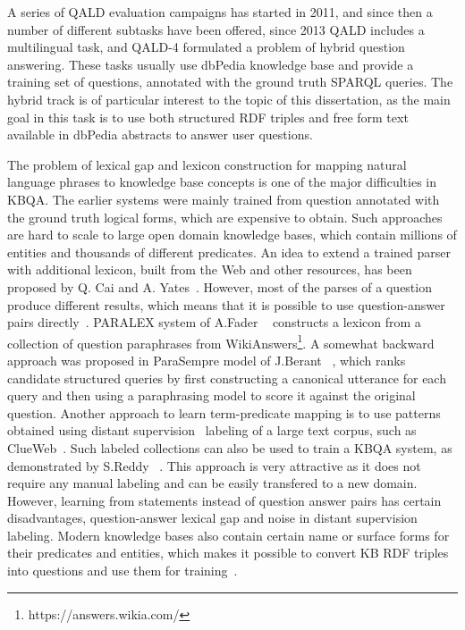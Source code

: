 A series of QALD evaluation campaigns has started in 2011, and since then a number of different subtasks have been offered, \ie since 2013 QALD includes a multilingual task, and QALD-4 formulated a problem of hybrid question answering.
These tasks usually use dbPedia knowledge base and provide a training set of questions, annotated with the ground truth SPARQL queries.
The hybrid track is of particular interest to the topic of this dissertation, as the main goal in this task is to use both structured RDF triples and free form text available in dbPedia abstracts to answer user questions.

The problem of lexical gap and lexicon construction for mapping natural language phrases to knowledge base concepts is one of the major difficulties in KBQA.
The earlier systems were mainly trained from question annotated with the ground truth logical forms, which are expensive to obtain.
Such approaches are hard to scale to large open domain knowledge bases, which contain millions of entities and thousands of different predicates.
An idea to extend a trained parser with additional lexicon, built from the Web and other resources, has been proposed by Q. Cai and A. Yates~\cite{CaiY13}.
However, most of the parses of a question produce different results, which means that it is possible to use question-answer pairs directly~\cite{BerantCFL13:sempre}.
PARALEX system of A.Fader \etal~\cite{fader2013paraphrase} constructs a lexicon from a collection of question paraphrases from WikiAnswers\footnote{https://answers.wikia.com/}.
A somewhat backward approach was proposed in ParaSempre model of J.Berant \etal~\cite{BerantL14:parasempre}, which ranks candidate structured queries by first constructing a canonical utterance for each query and then using a paraphrasing model to score it against the original question.
Another approach to learn term-predicate mapping is to use patterns obtained using distant supervision~\cite{MintzBSJ09} labeling of a large text corpus, such as ClueWeb~\cite{yao2014freebase}.
Such labeled collections can also be used to train a KBQA system, as demonstrated by S.Reddy \etal~\cite{ReddyLS14}.
This approach is very attractive as it does not require any manual labeling and can be easily transfered to a new domain.
However, learning from statements instead of question answer pairs has certain disadvantages, \eg question-answer lexical gap and noise in distant supervision labeling.
Modern knowledge bases also contain certain name or surface forms for their predicates and entities, which makes it possible to convert KB RDF triples into questions and use them for training~\cite{BordesCW14:emnlp}.
